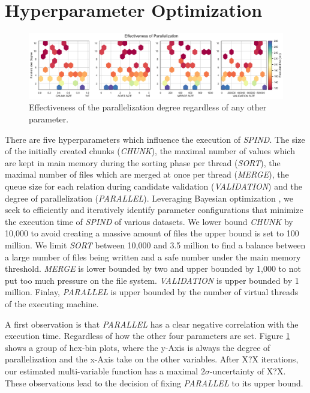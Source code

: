 \section{Hyperparameter Optimization}

\begin{figure}[t]
    \centering
    \includegraphics[width=.98\textwidth]{figures/parallelization.pdf}
    \caption{Effectiveness of the parallelization degree regardless of any other parameter.}
    \label{fig:parallelization_effectivness}
\end{figure}

There are five hyperparameters which influence the execution of \textit{SPIND}. The size of the initially created chunks (\textit{CHUNK}), the maximal number of values which are kept in main memory during the sorting phase per thread (\textit{SORT}), the maximal number of files which are merged at once per thread (\textit{MERGE}), the queue size for each relation during candidate validation (\textit{VALIDATION}) and the degree of parallelization (\textit{PARALLEL}). Leveraging Bayesian optimization \cite{shahriari2015taking}, we seek to efficiently and iteratively identify parameter configurations that minimize the execution time of \textit{SPIND} of various datasets. We lower bound \textit{CHUNK} by 10,000 to avoid creating a massive amount of files the upper bound is set to 100 million. We limit \textit{SORT} between 10,000 and 3.5 million to find a balance between a large number of files being written and a safe number under the main memory threshold. \textit{MERGE} is lower bounded by two and upper bounded by 1,000 to not put too much pressure on the file system. \textit{VALIDATION} is upper bounded by 1 million. Finlay, \textit{PARALLEL} is upper bounded by the number of virtual threads of the executing machine.

A first observation is that \textit{PARALLEL} has a clear negative correlation with the execution time. Regardless of how the other four parameters are set. Figure \ref{fig:parallelization_effectivness} shows a group of hex-bin plots, where the y-Axis is always the degree of parallelization and the x-Axis take on the other variables. After X?X iterations, our estimated multi-variable function has a maximal $2\sigma$-uncertainty of X?X. These observations lead to the decision of fixing \textit{PARALLEL} to its upper bound.

